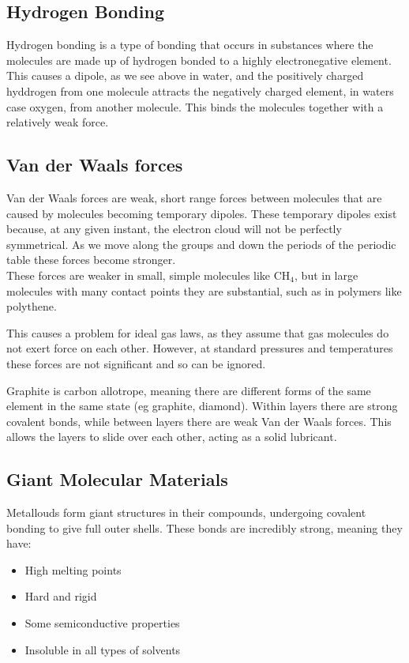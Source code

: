\documentclass[a4paper, 12pt]{article}
\begin{document}
	\subsection{Hydrogen Bonding}
		Hydrogen bonding is a type of bonding that occurs in substances where the molecules are made up of hydrogen bonded to a highly electronegative element. This causes a dipole, as we see above in water, and the positively charged hyddrogen from one molecule attracts the negatively charged element, in waters case oxygen, from another molecule. This binds the molecules together with a relatively weak force.

	\subsection{Van der Waals forces}
		Van der Waals forces are weak, short range forces between molecules that are caused by molecules becoming temporary dipoles. These temporary dipoles exist because, at any given instant, the electron cloud will not be perfectly symmetrical. As we move along the groups and down the periods of the periodic table these forces become stronger. \\
		These forces are weaker in small, simple molecules like CH$_4$, but in large molecules with many contact points they are substantial, such as in polymers like polythene. \\
		\par
		This causes a problem for ideal gas laws, as they assume that gas molecules do not exert force on each other. However, at standard pressures and temperatures these forces are not significant and so can be ignored. \\
		\par
		Graphite is carbon allotrope, meaning there are different forms of the same element in the same state (eg graphite, diamond). Within layers there are strong covalent bonds, while between layers there are weak Van der Waals forces. This allows the layers to slide over each other, acting as a solid lubricant. 

	\subsection{Giant Molecular Materials}
		Metallouds form giant structures in their compounds, undergoing covalent bonding to give full outer shells. These bonds are incredibly strong, meaning they have:
		\begin{itemize}
			\item High melting points
			\item Hard and rigid
			\item Some semiconductive properties
			\item Insoluble in all types of solvents
		\end{itemize}
\end{document}
